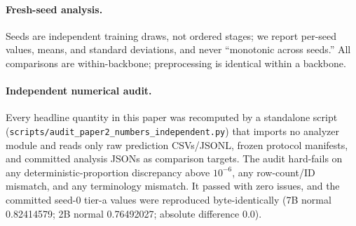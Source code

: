 \paragraph{Fresh-seed analysis.}
Seeds are independent training draws, not ordered stages; we report per-seed
values, means, and standard deviations, and never ``monotonic across
seeds.'' All comparisons are within-backbone; preprocessing is identical
within a backbone.

\paragraph{Independent numerical audit.}
Every headline quantity in this paper was recomputed by a standalone script
(\texttt{scripts/audit\_paper2\_numbers\_independent.py}) that imports no
analyzer module and reads only raw prediction CSVs/JSONL, frozen protocol
manifests, and committed analysis JSONs as comparison targets. The audit
hard-fails on any deterministic-proportion discrepancy above $10^{-6}$, any
row-count/ID mismatch, and any terminology mismatch. It passed with zero
issues, and the committed seed-0 tier-a values were reproduced
byte-identically (7B normal 0.82414579; 2B normal 0.76492027; absolute
difference 0.0).
